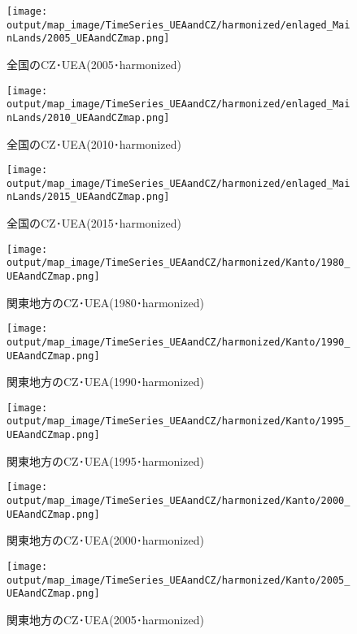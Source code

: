 \documentclass{ltjsarticle}
\begin{document}
  \begin{figure}[pbth]
    \centering
    \texttt{[image: output/map\_image/TimeSeries\_UEAandCZ/harmonized/enlaged\_MainLands/2005\_UEAandCZmap.png]}
    \caption{\label{ham:tsM2005}全国のCZ･UEA(2005･harmonized)}
  \end{figure}
  
  \begin{figure}[pbth]
    \centering
    \texttt{[image: output/map\_image/TimeSeries\_UEAandCZ/harmonized/enlaged\_MainLands/2010\_UEAandCZmap.png]}
    \caption{\label{ham:tsM2010}全国のCZ･UEA(2010･harmonized)}
  \end{figure}
  
  \begin{figure}[pbth]
    \centering
    \texttt{[image: output/map\_image/TimeSeries\_UEAandCZ/harmonized/enlaged\_MainLands/2015\_UEAandCZmap.png]}
    \caption{\label{ham:tsM2015}全国のCZ･UEA(2015･harmonized)}
  \end{figure}
  
  \begin{figure}[pbth]
    \centering
    \texttt{[image: output/map\_image/TimeSeries\_UEAandCZ/harmonized/Kanto/1980\_UEAandCZmap.png]}
    \caption{\label{ham:tsK1980}関東地方のCZ･UEA(1980･harmonized)}
  \end{figure}
  
  \begin{figure}[pbth]
    \centering
    \texttt{[image: output/map\_image/TimeSeries\_UEAandCZ/harmonized/Kanto/1990\_UEAandCZmap.png]}
    \caption{\label{ham:tsK1990}関東地方のCZ･UEA(1990･harmonized)}
  \end{figure}
  
  \begin{figure}[pbth]
    \centering
    \texttt{[image: output/map\_image/TimeSeries\_UEAandCZ/harmonized/Kanto/1995\_UEAandCZmap.png]}
    \caption{\label{ham:tsK1995}関東地方のCZ･UEA(1995･harmonized)}
  \end{figure}
  
  \begin{figure}[pbth]
    \centering
    \texttt{[image: output/map\_image/TimeSeries\_UEAandCZ/harmonized/Kanto/2000\_UEAandCZmap.png]}
    \caption{\label{ham:tsK2000}関東地方のCZ･UEA(2000･harmonized)}
  \end{figure}
  
  \begin{figure}[pbth]
    \centering
    \texttt{[image: output/map\_image/TimeSeries\_UEAandCZ/harmonized/Kanto/2005\_UEAandCZmap.png]}
    \caption{\label{ham:tsK2005}関東地方のCZ･UEA(2005･harmonized)}
  \end{figure}
  
\end{document}
